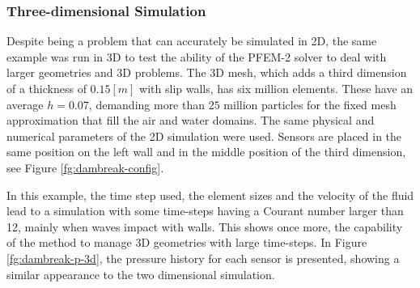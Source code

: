\clearpage

\subsubsection{Three-dimensional Simulation}\label{sec:ETSIN-3d}

Despite being a problem that can accurately be simulated in 2D, the same example was run in 3D to test the ability of the PFEM-2 solver to deal with larger geometries and 3D problems. The 3D mesh, which adds a third dimension of a thickness of $0.15[m]$ with slip walls, has six million elements. These have an average $h=0.07$, demanding more than $25$ million particles for the fixed mesh approximation that fill the air and water domains. The same physical and numerical parameters of the 2D simulation were used. Sensors are placed in the same position on the left wall and in the middle position of the third dimension, see Figure \ref{fg:dambreak-config}.

In this example, the time step used, the element sizes and the velocity of the fluid lead to a simulation with some time-steps having a Courant number larger than 12, mainly when waves impact with walls. This shows once more, the capability of the method to manage 3D geometries with large time-steps. In Figure \ref{fg:dambreak-p-3d}, the pressure history for each sensor is presented, showing a similar appearance to the two dimensional simulation.

